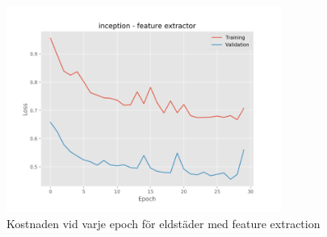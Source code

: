 \documentclass[]{kththesis}
\begin{document}
\begin{figure}[h]
    \includegraphics[width=9cm]{f_l_inception_fe}
    \caption{Kostnaden vid varje epoch för eldstäder med feature extraction}
    \label{fig:f_l_1}
  \end{figure}
  
\end{document}
